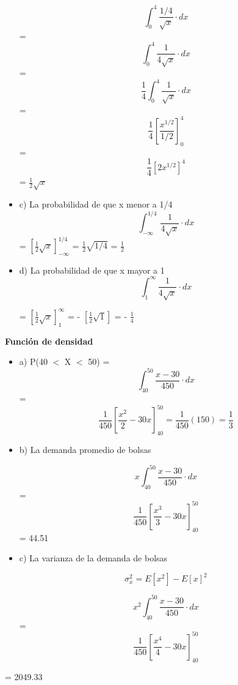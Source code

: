 \documentclass{oxmathproblems}
\begin{document}
\begin{questions}
\begin{itemize}
\begin{equation}
\int_{0}^{4} \frac{1/4}{\sqrt{x}} \cdot dx
\end{equation}
= 
\begin{equation}
\int_{0}^{4} \frac{1}{4\sqrt{x}} \cdot dx
\end{equation}
= 
\begin{equation}
 \frac{1}{4} \int_{0}^{4} \frac{1}{\sqrt{x}} \cdot dx
\end{equation}
= 
$$ \frac{1}{4}[\frac{x^{1/2}}{1/2}]^{4}_{0}
$$
= $$ \frac{1}{4}[2x^{1/2}]^{4}
$$
= $\frac{1}{2}\sqrt{x}$


\item  c) La probabilidad de que x menor a 1/4
\begin{equation}
\int_{-\infty}^{1/4} \frac{1}{4\sqrt{x}} \cdot dx
\end{equation} 
=  $[\frac{1}{2}\sqrt{x}]_{-\infty}^{1/4}$ = $\frac{1}{2}\sqrt{1/4}$
= $\frac{1}{2}$ 


\item  d) La probabilidad de que x mayor a 1
\begin{equation}
 \int_{1}^{\infty} \frac{1}{4\sqrt{x}} \cdot dx
\end{equation}

=  $[\frac{1}{2}\sqrt{x}]_{1}^{\infty}$ = - $[\frac{1}{2}\sqrt{1}]$ = - $\frac{1}{4}$ 

\end{itemize}

\miquestion\textbf{Función de densidad}
\begin{itemize}
\item  a) 
 P(40 $<$ X $<$ 50) = 
\begin{equation}
 \int_{40}^{50} \frac{x-30}{450} \cdot dx
\end{equation} 
= $$ \frac{1}{450} [\frac{x^2}{2}-30x]^{50}_{40} = \frac{1}{450}(150) = \frac{1}{3} $$ 

\item  b) La demanda promedio de bolsas 

\begin{equation}
 x \int_{40}^{50} \frac{x-30}{450} \cdot dx
\end{equation} 
= $$ \frac{1}{450} [\frac{x^3}{3}-30x]^{50}_{40} $$ = 44.51


\item  c) La varianza de la demanda de bolsas

$$ \sigma_x^2 = E[x^2]-E[x]^2 $$ 

\begin{equation}
x^2 \int_{40}^{50} \frac{x-30}{450} \cdot dx
\end{equation} 
= $$ \frac{1}{450} [\frac{x^4}{4}-30x]^{50}_{40} $$
\end{itemize} 
= 2049.33


\end{questions}
\end{document}
